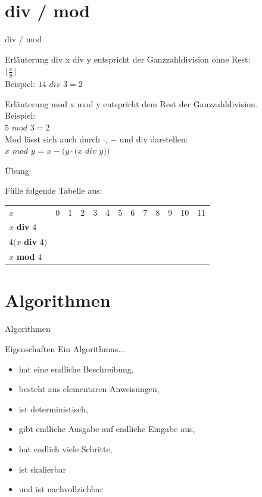 	\section{div / mod}
	\begin{frame} {div / mod}
		\begin{block} {Erläuterung div}
			x div y entspricht der Ganzzahldivision ohne Rest:\\ $\lfloor \frac{x}{y} \rfloor$\\
			Beispiel: $14$ $div$ $3 = 2$
		\end{block}
		\begin{block} {Erläuterung mod}
			x mod y entspricht dem Rest der Ganzzahldivision.\\
			Beispiel:\\
			$5$ $mod$ $3 = 2$\\
			Mod lässt sich auch durch $\cdot$, $-$ und div darstellen:\\
			$x$ $mod$ $y$ = $x - (y \cdot (x$ $div$ $y))$
		\end{block}
	\end{frame}
	
	
	\begin{frame} {Übung}
		\begin{block}{}
		Fülle folgende Tabelle aus:\\
		\vspace{10pt}
			\begin{tabular}{l|cccccccccccc}
				$x$ & 0 & 1 & 2 & 3 & 4 & 5 & 6 & 7 & 8 & 9 & 10 & 11\\
				$x$ \textbf{div} $4$ & & & & & & & & & & & & \\
				$4(x$ \textbf{div} $4)$ & & & & & & & & & & & & \\
				$x$ \textbf{mod} $4$ & & & & & & & & & & & & \\
			\end{tabular}
		\end{block}
	\end{frame}
	
	
	\section{Algorithmen}
	\begin{frame} {Algorithmen}
		\begin{block} {Eigenschaften}
			Ein Algorithmus...\\
			\begin{itemize}
				\item hat eine endliche Beschreibung,
				\pause
				\item besteht aus elementaren Anweisungen,
				\pause
				\item ist deterministisch,
				\pause
				\item gibt endliche Ausgabe auf endliche Eingabe aus,
				\pause
				\item hat endlich viele Schritte,
				\pause
				\item ist skalierbar
				\pause
				\item und ist nachvollziehbar
			\end{itemize}
		\end{block}
	\end{frame}
	
